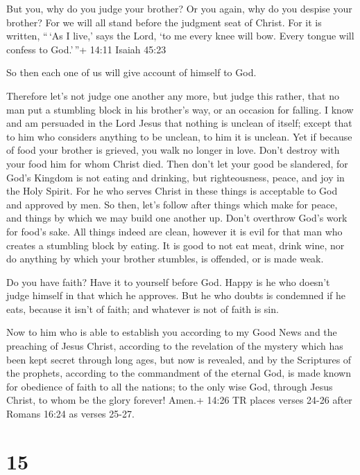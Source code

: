  But you, why do you judge your brother? Or you again, why
do you despise your brother? For we will all stand before the judgment
seat of Christ.  For it is written, ``\,`As I live,' says
the Lord, `to me every knee will bow. Every tongue will confess to
God.'\,''+ 14:11 Isaiah 45:23

 So then each one of us will give account of himself to
God.

 Therefore let's not judge one another any more, but judge
this rather, that no man put a stumbling block in his brother's way, or
an occasion for falling.  I know and am persuaded in the
Lord Jesus that nothing is unclean of itself; except that to him who
considers anything to be unclean, to him it is unclean. 
Yet if because of food your brother is grieved, you walk no longer in
love. Don't destroy with your food him for whom Christ died.
 Then don't let your good be slandered,  for
God's Kingdom is not eating and drinking, but righteousness, peace, and
joy in the Holy Spirit.  For he who serves Christ in these
things is acceptable to God and approved by men.  So then,
let's follow after things which make for peace, and things by which we
may build one another up.  Don't overthrow God's work for
food's sake. All things indeed are clean, however it is evil for that
man who creates a stumbling block by eating.  It is good to
not eat meat, drink wine, nor do anything by which your brother
stumbles, is offended, or is made weak.

 Do you have faith? Have it to yourself before God. Happy
is he who doesn't judge himself in that which he approves. 
But he who doubts is condemned if he eats, because it isn't of faith;
and whatever is not of faith is sin.

 Now to him who is able to establish you according to my
Good News and the preaching of Jesus Christ, according to the revelation
of the mystery which has been kept secret through long ages,
 but now is revealed, and by the Scriptures of the
prophets, according to the commandment of the eternal God, is made known
for obedience of faith to all the nations;  to the only
wise God, through Jesus Christ, to whom be the glory forever! Amen.+
14:26 TR places verses 24-26 after Romans 16:24 as verses 25-27.

\hypertarget{section-14}{%
\section{15}\label{section-14}}

